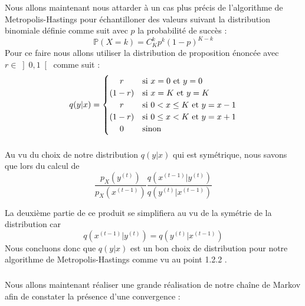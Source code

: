 Nous allons maintenant nous attarder à un cas plus précis de l'algorithme de Metropolis-Hastings pour échantilloner des valeurs suivant la 
distribution binomiale définie comme suit avec $p$ la probabilité de succès :
\begin{equation*}
  \mathbb{P}(X = k) = C_K^k p^k(1-p)^{K-k}
\end{equation*}
Pour ce faire nous allons utiliser la distribution de proposition énoncée avec \(r \in \left] 0, 1\right[\) comme suit :
\begin{equation*}
  q(y|x) = 
  \begin{cases}
    \hfil r & \text{si } x = 0 \text{ et } y = 0\\
    \hfil (1-r) &  \text{si } x = K \text{ et } y = K\\
    \hfil r & \text{si } 0 < x \leq K \text{ et } y = x - 1\\
    \hfil (1-r) & \text{si } 0 \leq x < K \text{ et } y = x + 1\\
    \hfil 0 & \text{sinon}
  \end{cases}
\end{equation*}

\subsubsection{}
Au vu du choix de notre distribution $q(y|x)$ qui est symétrique, nous savons que lors du calcul de 
\begin{equation*}
  \frac{p_X(y^{(t)})}{p_X(x^{(t-1)})} \frac{q(x^{(t-1)}|y^{(t)})}{q(y^{(t)}|x^{(t-1)})}
\end{equation*}

La deuxième partie de ce produit se simplifiera au vu de la symétrie de la distribution car
\begin{equation*}
  q(x^{(t-1)}|y^{(t)}) = q(y^{(t)}|x^{(t-1)})
\end{equation*}
Nous concluons donc que $q(y|x)$ est un bon choix de distribution pour notre algorithme de Metropolis-Hastings comme vu au point 1.2.2 .

\subsubsection{}
\label{section:1.3.2}
Nous allons maintenant réaliser une grande réalisation de notre chaîne de Markov afin de constater la présence d'une convergence :


